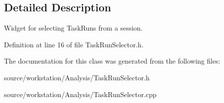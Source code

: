 \subsection{Detailed Description}
Widget for selecting Task\-Runs from a session. 

Definition at line 16 of file Task\-Run\-Selector.\-h.



The documentation for this class was generated from the following files\-:\begin{DoxyCompactItemize}
\item 
source/workstation/\-Analysis/Task\-Run\-Selector.\-h\item 
source/workstation/\-Analysis/Task\-Run\-Selector.\-cpp\end{DoxyCompactItemize}
